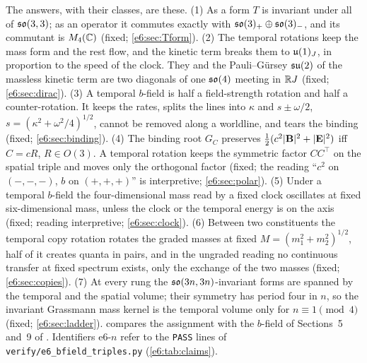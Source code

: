 The answers, with their classes, are these. (1) As a form $T$ is invariant under all of $\mathfrak{so}(3,3)$; as an operator it commutes exactly with
$\mathfrak{so}(3)_+\oplus\mathfrak{so}(3)_-$, and its commutant is $M_4(\mathbb{C})$ (fixed; \cref{e6:sec:Tform}). (2) The temporal rotations keep the mass form and the rest
flow, and the kinetic term breaks them to $\mathfrak{u}(1)_J$, in proportion to the speed of the clock. They and the Pauli--G\"ursey $\mathfrak{su}(2)$ of the massless
kinetic term are two diagonals of one $\mathfrak{so}(4)$ meeting in $\mathbb{R} J$ (fixed; \cref{e6:sec:dirac}). (3) A temporal $b$-field is half a field-strength
rotation and half a counter-rotation. It keeps the rates, splits the lines into $\kappa$ and $s\pm\omega/2$, $s=(\kappa^2+\omega^2/4)^{1/2}$, cannot be
removed along a worldline, and tears the binding (fixed; \cref{e6:sec:binding}). (4) The binding root $G_C$ preserves
$\tfrac12(c^2|\mathbf B|^2+|\mathbf E|^2)$ iff $C=cR$, $R\in O(3)$. A temporal rotation keeps the symmetric factor $CC^{\!\top}$ on the spatial triple and moves
only the orthogonal factor (fixed; the reading ``$c^2$ on $(-,-,-)$, $b$ on $(+,+,+)$'' is interpretive; \cref{e6:sec:polar}). (5) Under a temporal
$b$-field the four-dimensional mass read by a fixed clock oscillates at fixed six-dimensional mass, unless the clock or the temporal energy is on
the axis (fixed; reading interpretive; \cref{e6:sec:clock}). (6) Between two constituents the temporal copy rotation rotates the graded masses at
fixed $M=(m_1^2+m_2^2)^{1/2}$, half of it creates quanta in pairs, and in the ungraded reading no continuous transfer at fixed spectrum exists,
only the exchange of the two masses (fixed;
\cref{e6:sec:copies}). (7) At every rung the $\mathfrak{so}(3n,3n)$-invariant forms are spanned by the temporal and the spatial volume; their symmetry has
period four in $n$, so the invariant Grassmann mass kernel is the temporal volume only for $n\equiv1\pmod4$ (fixed; \cref{e6:sec:ladder}).
 compares the assignment with the $b$-field of Sections~5 and~9 of \cite{RE}. Identifiers e6-$n$ refer to the \texttt{PASS} lines of
\texttt{verify/e6\_bfield\_triples.py} (\cref{e6:tab:claims}).

